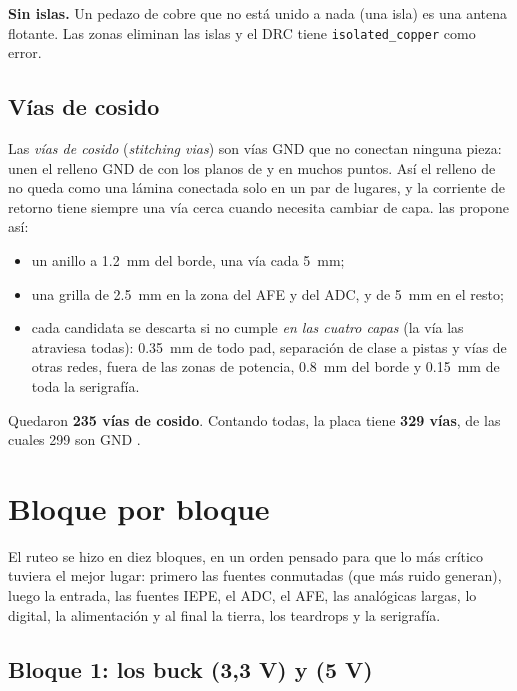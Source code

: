 \textbf{Sin islas.} Un pedazo de cobre que no está unido a nada (una isla) es una antena flotante. Las zonas eliminan
las islas y el DRC tiene \texttt{isolated\_copper} como error.

\subsection{Vías de cosido}

Las \emph{vías de cosido} (\emph{stitching vias}) son vías GND que no conectan ninguna pieza: unen el relleno GND de
 con los planos de  y  en muchos puntos. Así el relleno de  no queda como
una lámina conectada solo en un par de lugares, y la corriente de retorno tiene siempre una vía cerca cuando necesita
cambiar de capa.  las propone así:
\begin{itemize}
  \item un anillo a \SI{1.2}{\milli\meter} del borde, una vía cada \SI{5}{\milli\meter};
  \item una grilla de \SI{2.5}{\milli\meter} en la zona del AFE y del ADC, y de \SI{5}{\milli\meter} en el resto;
  \item cada candidata se descarta si no cumple \emph{en las cuatro capas} (la vía las atraviesa todas):
  \SI{0.35}{\milli\meter} de todo pad, separación de clase a pistas y vías de otras redes, fuera de las zonas de
  potencia, \SI{0.8}{\milli\meter} del borde y \SI{0.15}{\milli\meter} de toda la serigrafía.
\end{itemize}
Quedaron \textbf{235 vías de cosido}. Contando todas, la placa tiene \textbf{329 vías}, de las cuales 299 son GND
\medido.

\section{Bloque por bloque}\label{sec:c09-bloques}

El ruteo se hizo en diez bloques, en un orden pensado para que lo más crítico tuviera el mejor lugar: primero las
fuentes conmutadas (que más ruido generan), luego la entrada, las fuentes IEPE, el ADC, el AFE, las analógicas largas,
lo digital, la alimentación y al final la tierra, los teardrops y la serigrafía.

\subsection{Bloque 1: los buck  (3,3 V) y  (5 V)}

